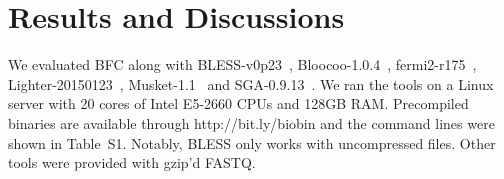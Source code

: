 \documentclass{bioinfo}
\begin{document}
\section{Results and Discussions}

We evaluated BFC along with
BLESS-v0p23~\citep{Heo:2014aa}, Bloocoo-1.0.4~\citep{Drezen:2014aa},
fermi2-r175~\citep{Li:2012fk}, Lighter-20150123~\citep{Song:2014aa},
Musket-1.1~\citep{Liu:2013ac} and SGA-0.9.13~\citep{Simpson:2012aa}.
We ran the tools on a Linux server with 20 cores of Intel
E5-2660 CPUs and 128GB RAM. Precompiled binaries are available through
http://bit.ly/biobin and the command lines were shown in Table~S1.
Notably, BLESS only works with uncompressed files. Other tools were
provided with gzip'd FASTQ.
\end{document}
